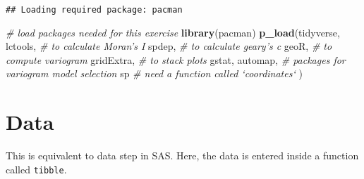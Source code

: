 \documentclass[]{book}
\newenvironment{Shaded}{\begin{snugshade}}{\end{snugshade}}
\newcommand{\CommentTok}[1]{\textcolor[rgb]{0.56,0.35,0.01}{\textit{#1}}}
\newcommand{\DataTypeTok}[1]{\textcolor[rgb]{0.13,0.29,0.53}{#1}}
\newcommand{\DecValTok}[1]{\textcolor[rgb]{0.00,0.00,0.81}{#1}}
\newcommand{\KeywordTok}[1]{\textcolor[rgb]{0.13,0.29,0.53}{\textbf{#1}}}
\newcommand{\NormalTok}[1]{#1}
\newcommand{\OperatorTok}[1]{\textcolor[rgb]{0.81,0.36,0.00}{\textbf{#1}}}
\newcommand{\StringTok}[1]{\textcolor[rgb]{0.31,0.60,0.02}{#1}}
\begin{document}
\begin{verbatim}
## Loading required package: pacman
\end{verbatim}

\begin{Shaded}
\begin{Highlighting}[]
\CommentTok{# load packages needed for this exercise}
\KeywordTok{library}\NormalTok{(pacman)}
\KeywordTok{p_load}\NormalTok{(tidyverse,}
\NormalTok{       lctools, }\CommentTok{# to calculate Moran's I}
\NormalTok{       spdep, }\CommentTok{# to calculate geary's c}
\NormalTok{       geoR, }\CommentTok{# to compute variogram}
\NormalTok{       gridExtra, }\CommentTok{# to stack plots}
\NormalTok{       gstat, automap, }\CommentTok{# packages for variogram model selection}
\NormalTok{       sp }\CommentTok{# need a function called `coordinates`}
\NormalTok{       )}
\end{Highlighting}
\end{Shaded}

\hypertarget{data-1}{%
\section{Data}\label{data-1}}

This is equivalent to data step in SAS. Here, the data is entered inside a function called \texttt{tibble}.

\begin{Shaded}
\end{Shaded}
\end{document}
